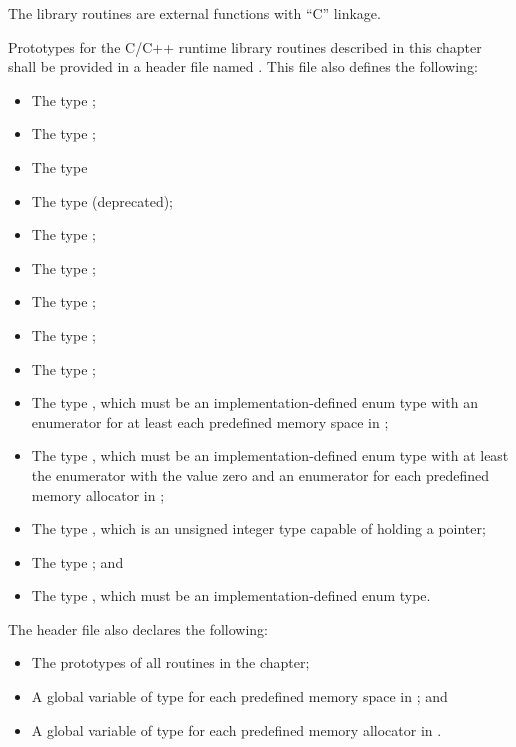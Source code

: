 \begin{ccppspecific}
The library routines are external functions with ``C'' linkage.

Prototypes for the C/C++ runtime library routines described in this 
chapter shall be provided in a header file named . This 
file also defines the following:

\begin{itemize}
\item The type ;
\item The type ;
\item The type 
\item The type  (deprecated);
\item The type ;
\item The type ;
\item The type ;
\item The type ;
\item The type ;
\item The type , which must be an 
      implementation-defined enum type with an enumerator for 
      at least each predefined memory space in 
      ;
\item The type , which must be an
      implementation-defined enum type with at least the 
       enumerator with the value 
      zero and an enumerator for each predefined memory allocator 
      in ;
\item The type , which is an unsigned integer type 
      capable of holding a pointer;
\item The type ; and
\item The type , which must be an 
      implementation-defined enum type.
\end{itemize}

The header file also declares the following:

\begin{itemize}
\item The prototypes of all routines in the chapter;
\item A global variable of type  for each 
      predefined memory space in ; and
\item A global variable of type  for each 
      predefined memory allocator in .
\end{itemize}


\end{ccppspecific}
